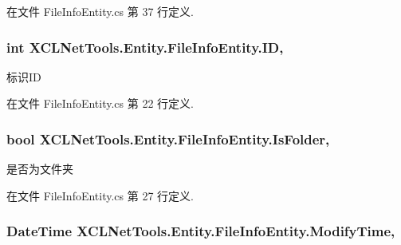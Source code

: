 在文件 File\-Info\-Entity.\-cs 第 37 行定义.

\hypertarget{class_x_c_l_net_tools_1_1_entity_1_1_file_info_entity_a150f26081f12badeea9a2255bbea6faf}{
\subsubsection[{I\-D}]{\setlength{\rightskip}{0pt plus 5cm}int X\-C\-L\-Net\-Tools.\-Entity.\-File\-Info\-Entity.\-I\-D\hspace{0.3cm}{\ttfamily [get]}, {\ttfamily [set]}}}\label{class_x_c_l_net_tools_1_1_entity_1_1_file_info_entity_a150f26081f12badeea9a2255bbea6faf}


标识\-I\-D 



在文件 File\-Info\-Entity.\-cs 第 22 行定义.

\hypertarget{class_x_c_l_net_tools_1_1_entity_1_1_file_info_entity_ad945716535742c01f83dffc2766c0987}{
\subsubsection[{Is\-Folder}]{\setlength{\rightskip}{0pt plus 5cm}bool X\-C\-L\-Net\-Tools.\-Entity.\-File\-Info\-Entity.\-Is\-Folder\hspace{0.3cm}{\ttfamily [get]}, {\ttfamily [set]}}}\label{class_x_c_l_net_tools_1_1_entity_1_1_file_info_entity_ad945716535742c01f83dffc2766c0987}


是否为文件夹 



在文件 File\-Info\-Entity.\-cs 第 27 行定义.

\hypertarget{class_x_c_l_net_tools_1_1_entity_1_1_file_info_entity_a64c6633bec7e4d547632c122dbaad9f8}{
\subsubsection[{Modify\-Time}]{\setlength{\rightskip}{0pt plus 5cm}Date\-Time X\-C\-L\-Net\-Tools.\-Entity.\-File\-Info\-Entity.\-Modify\-Time\hspace{0.3cm}{\ttfamily [get]}, {\ttfamily [set]}}}\label{class_x_c_l_net_tools_1_1_entity_1_1_file_info_entity_a64c6633bec7e4d547632c122dbaad9f8}


